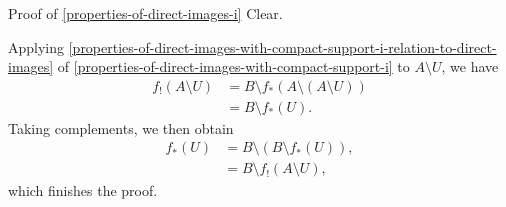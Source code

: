 \begin{Proof}{Proof of \cref{properties-of-direct-images-i}}
    Clear.

    Applying \cref{properties-of-direct-images-with-compact-support-i-relation-to-direct-images} of \cref{properties-of-direct-images-with-compact-support-i} to $A\setminus U$, we have
    \begin{align*}
        f_{!}(A\setminus U) &= B\setminus f_{*}(A\setminus(A\setminus U))\\
                            &= B\setminus f_{*}(U).
    \end{align*}
    Taking complements, we then obtain
    \begin{align*}
        f_{*}(U) &= B\setminus(B\setminus f_{*}(U)),\\
                 &= B\setminus f_{!}(A\setminus U),
    \end{align*}
    which finishes the proof.
\end{Proof}
